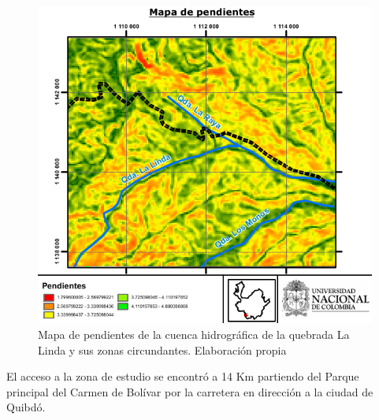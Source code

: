 \begin{figure}[H]
\centering
\includegraphics[scale=1]{img/pendientes.pdf}
\caption{Mapa de pendientes de la cuenca hidrogr\'afica de la quebrada La Linda y sus zonas circundantes. Elaboraci\'on propia}
\label{fig:slopes}
\end{figure}
El acceso a la zona de estudio se encontr\'o a 14 Km partiendo del Parque principal del Carmen de Bol\'ivar por la carretera en direcci\'on a la ciudad de Quibd\'o.
